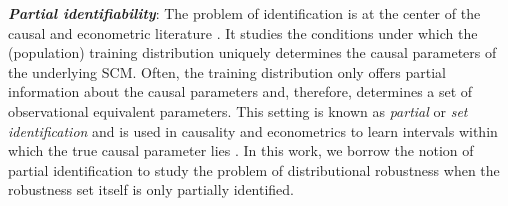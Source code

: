


\textit{\textbf{Partial identifiability}}:
The problem of identification is at the center of the causal and econometric literature \citep{peters2017elements, amemiya1985advanced}. It studies the conditions under which the (population) training distribution uniquely determines the causal parameters of the underlying SCM.
Often, the training distribution only offers partial information about the causal parameters and, therefore, determines a set of observational equivalent parameters. This setting is known as \emph{partial} or \emph{set identification} and is used in causality and econometrics to learn intervals within which the true causal parameter lies \citep{tamer2010partial}.
In this work, we borrow the notion of partial identification to study the problem of distributional robustness when the robustness set itself is only partially identified. 


